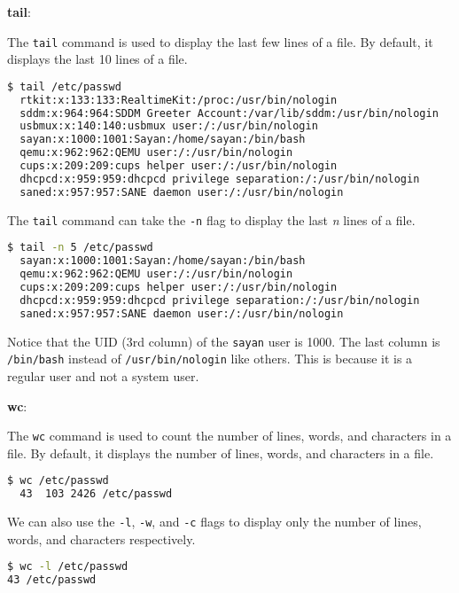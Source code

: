 \textbf{tail}:

The \lstinline|tail| command is used to display the last few lines of a file.
By default, it displays the last 10 lines of a file.

\begin{lstlisting}[language=bash]
  $ tail /etc/passwd
  rtkit:x:133:133:RealtimeKit:/proc:/usr/bin/nologin
  sddm:x:964:964:SDDM Greeter Account:/var/lib/sddm:/usr/bin/nologin
  usbmux:x:140:140:usbmux user:/:/usr/bin/nologin
  sayan:x:1000:1001:Sayan:/home/sayan:/bin/bash
  qemu:x:962:962:QEMU user:/:/usr/bin/nologin
  cups:x:209:209:cups helper user:/:/usr/bin/nologin
  dhcpcd:x:959:959:dhcpcd privilege separation:/:/usr/bin/nologin
  saned:x:957:957:SANE daemon user:/:/usr/bin/nologin
\end{lstlisting}

The \lstinline|tail| command can take the \lstinline|-n| flag to display the last \textit{n} lines of a file.

\begin{lstlisting}[language=bash]
  $ tail -n 5 /etc/passwd
  sayan:x:1000:1001:Sayan:/home/sayan:/bin/bash
  qemu:x:962:962:QEMU user:/:/usr/bin/nologin
  cups:x:209:209:cups helper user:/:/usr/bin/nologin
  dhcpcd:x:959:959:dhcpcd privilege separation:/:/usr/bin/nologin
  saned:x:957:957:SANE daemon user:/:/usr/bin/nologin
\end{lstlisting}

\begin{exercise}
  Notice that the UID (3rd column) of the \lstinline|sayan| user is 1000.
  The last column is \lstinline|/bin/bash| instead of \lstinline|/usr/bin/nologin| like others.
  This is because it is a regular user and not a system user.
\end{exercise}

\textbf{wc}:

The \lstinline|wc| command is used to count the number of lines, words, and characters in a file.
By default, it displays the number of lines, words, and characters in a file.

\begin{lstlisting}[language=bash]
$ wc /etc/passwd
  43  103 2426 /etc/passwd
\end{lstlisting}

We can also use the \lstinline|-l|, \lstinline|-w|, and \lstinline|-c| flags to display only the number of lines, words, and characters respectively.

\begin{lstlisting}[language=bash]
$ wc -l /etc/passwd
43 /etc/passwd
\end{lstlisting}


